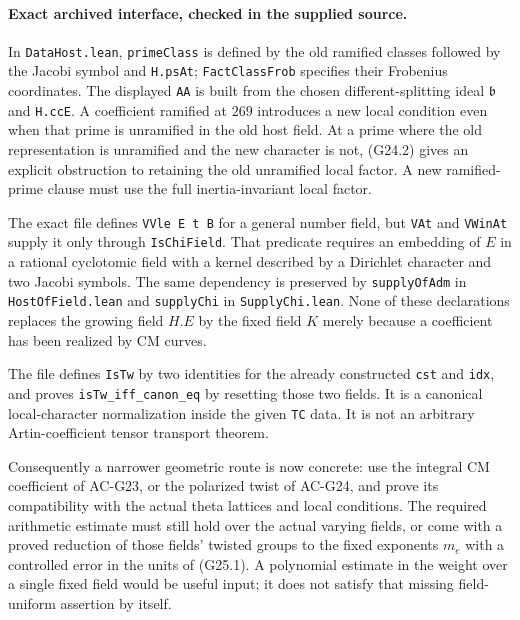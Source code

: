 \paragraph{Exact archived interface, checked in the supplied source.}
In \texttt{DataHost.lean}, \texttt{primeClass} is defined by the
old ramified classes followed by the Jacobi symbol and
\texttt{H.psAt}; \texttt{FactClassFrob} specifies their Frobenius
coordinates.  The displayed \texttt{AA} is built from the chosen
different-splitting ideal $\mathfrak b$ and
\texttt{H.ccE}.  A coefficient ramified at $269$ introduces a new
local condition even when that prime is unramified in the old
host field.  At a prime where the old representation is unramified
and the new character is not, (G24.2) gives an explicit obstruction
to retaining the old unramified local factor.  A new ramified-prime
clause must use the full inertia-invariant local factor.

The exact file
defines \texttt{VVle E t B} for a general number field, but
\texttt{VAt} and \texttt{VWinAt} supply it only through
\texttt{IsChiField}.  That predicate requires an embedding of
$E$ in a rational cyclotomic field with a kernel described by a
Dirichlet character and two Jacobi symbols.
The same dependency is preserved by \texttt{supplyOfAdm} in
\texttt{HostOfField.lean} and \texttt{supplyChi} in
\texttt{SupplyChi.lean}.  None of these declarations
replaces the growing field $H.E$ by the fixed field $K$ merely
because a coefficient has been realized by CM curves.

The file
defines \texttt{IsTw} by two identities for the already constructed
\texttt{cst} and \texttt{idx}, and proves
\texttt{isTw\_iff\_canon\_eq} by resetting those two fields.
It is a canonical local-character normalization inside the given
\texttt{TC} data.  It is not an arbitrary Artin-coefficient tensor
transport theorem.

Consequently a narrower geometric route is now concrete: use the
integral CM coefficient of AC-G23, or the polarized twist of AC-G24,
and prove its compatibility with the actual theta lattices and
local conditions.  The required arithmetic estimate must still
hold over the actual varying fields, or come with a proved
reduction of those fields' twisted groups to the fixed exponents
$m_e$ with a controlled error in the units of (G25.1).
A polynomial estimate in the weight over a single fixed field
would be useful input; it does not satisfy that missing
field-uniform assertion by itself.
